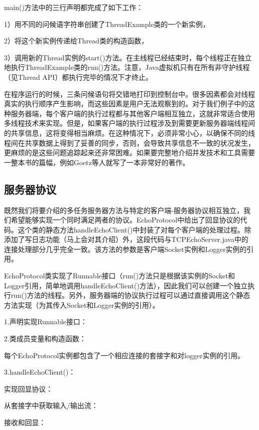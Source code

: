 		main()方法中的三行声明都完成了如下工作：

		1）用不同的问候语字符串创建了ThreadExample类的一个新实例，

		2）将这个新实例传递给Thread类的构造函数，

		3）调用新的Thread实例的start()方法。在主线程已经结束时，每个线程正在独立地执行ThreadExample类的run()方法。注意，Java虚拟机只有在所有非守护线程（见Thread API）都执行完毕的情况下才终止。 

		在程序运行的时候，三条问候语句将交错地打印到控制台中。很多因素都会对线程真实的执行顺序产生影响，而这些因素是用户无法观察到的。对于我们例子中的这种服务器端，每个客户端的执行过程都与其他客户端相互独立，这就非常适合使用多线程技术来实现。但是，如果客户端的执行过程涉及到需要更新服务器端线程间的共享信息，这将变得相当麻烦。在这种情况下，必须非常小心，以确保不同的线程间在共享数据上得到了妥善的同步，否则，会导致共享信息不一致的状况发生，更麻烦的是这些问题追踪起来还非常困难。如果要完整地介绍并发技术和工具需要一整本书的篇幅，例如Goetz等人就写了一本非常好的著作。 

	\subsection{服务器协议}

		既然我们将要介绍的多任务服务器方法与特定的客户端-服务器协议相互独立，我们希望能够实现一个同时满足两者的协议。EchoProtocol中给出了回显协议的代码。这个类的静态方法handleEchoClient()中封装了对每个客户端的处理过程。除添加了写日志功能（马上会对其介绍）外，这段代码与TCPEchoServer.java中的连接处理部分几乎完全一致。该方法的参数是客户端Socket实例和Logger实例的引用。 

		EchoProtocol类实现了Runnable接口（run()方法只是根据该实例的Socket和Logger引用，简单地调用handleEchoClient()方法），因此我们可以创建一个独立执行run()方法的线程。另外，服务器端的协议执行过程可以通过直接调用这个静态方法实现（为其传入Socket和Logger实例的引用）。 

		

		1.声明实现Runnable接口：

		2.类成员变量和构造函数：

		每个EchoProtocol实例都包含了一个相应连接的套接字和对logger实例的引用。 

		3.handleEchoClient()：

		实现回显协议： 

		从套接字中获取输入/输出流：

		接收和回显：

